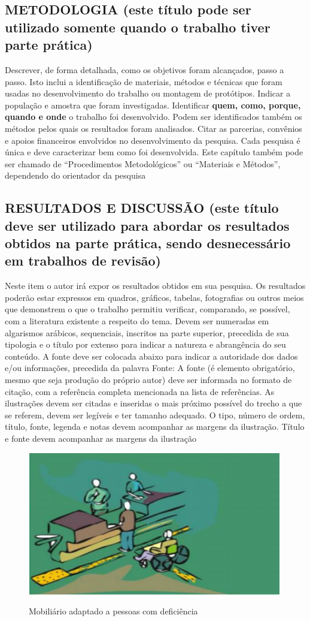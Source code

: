 \documentclass[12pt]{article}
\begin{document}
\subsection{METODOLOGIA (este título pode ser utilizado somente quando o trabalho tiver parte prática)}

Descrever, de forma detalhada, como os objetivos foram alcançados, passo a passo. Isto inclui a identificação de materiais, métodos e técnicas que foram usadas no desenvolvimento do trabalho ou montagem de protótipos. Indicar a população e amostra que foram investigadas. Identificar \textbf{quem, como, porque, quando e onde } o trabalho foi desenvolvido. Podem ser identificados também os métodos pelos quais os resultados foram analisados. Citar as parcerias, convênios e apoios financeiros envolvidos no desenvolvimento da pesquisa. Cada pesquisa é única e deve caracterizar bem como foi desenvolvida.
Este capítulo também pode ser chamado de “Procedimentos Metodológicos” ou “Materiais e Métodos”, dependendo do orientador da pesquisa


\subsection{RESULTADOS E DISCUSSÃO (este título deve ser utilizado para abordar os resultados obtidos na parte prática, sendo desnecessário em trabalhos de revisão)}


Neste item o autor irá expor os resultados obtidos em sua pesquisa. Os resultados poderão estar expressos em quadros, gráficos, tabelas, fotografias ou outros meios que demonstrem o que o trabalho permitiu verificar, comparando, se possível, com a literatura existente a respeito do tema. 
Devem ser numeradas em algarismos arábicos, sequenciais, inscritos na parte superior, precedida de sua tipologia e o título por extenso para indicar a natureza e abrangência do seu conteúdo. A fonte deve ser colocada abaixo para indicar a autoridade dos dados e/ou informações, precedida da palavra Fonte: A fonte (é elemento obrigatório, mesmo que seja produção do próprio autor) deve ser informada no formato de citação, com a referência completa mencionada na lista de referências.
As ilustrações devem ser citadas e inseridas o mais próximo possível do trecho a que se referem, devem ser legíveis e ter tamanho adequado. O tipo, número de ordem, título, fonte, legenda e notas devem acompanhar as margens da ilustração. Título e fonte devem acompanhar as margens da ilustração

\begin{figure}[h]
\centering
\caption{Mobiliário adaptado a pessoas com deficiência}
\includegraphics[width=.5\textwidth]{Fig/pupo.PNG}
{\footnotesize{}} %
\label{fig1}
\end{figure} 
\end{document}
